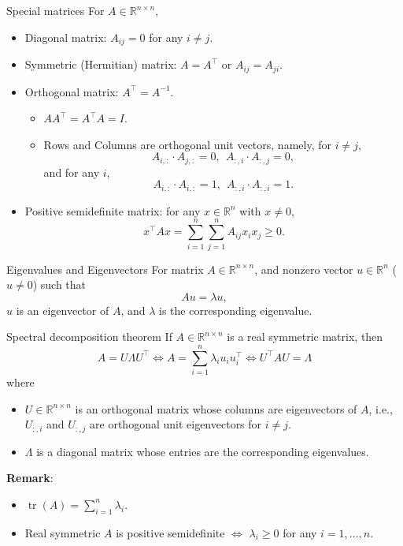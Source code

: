 \documentclass[10pt]{beamer}
\begin{document}
\begin{frame}{Special matrices}
For $A \in \mathbb{R}^{n \times n}$,
\begin{itemize}
    \item Diagonal matrix: $A_{ij} = 0$ for any $i \ne j$. 
    \item Symmetric (Hermitian) matrix: $A = A^\top$ or $A_{ij} = A_{ji}$.
    \item Orthogonal matrix: $A^\top = A^{-1}$. 
        \begin{itemize}
            \item $AA^\top = A^\top A = I$. 
            \item Rows and Columns are  orthogonal unit vectors, namely, for $i \ne j$,
            \[A_{i, :} \cdot A_{j, :} = 0, ~~ A_{:, i}\cdot A_{:, j} = 0,\]
            and for any $i$,
            \[A_{i, :} \cdot A_{i, :} = 1, ~~ A_{:, i}\cdot A_{:, i} = 1.\]
        \end{itemize}
    \item Positive semidefinite matrix: for any $x \in \mathbb{R}^n$ with $x \ne 0$, 
    \[
        x^\top A x = \sum_{i = 1}^n\sum_{j = 1}^n A_{ij}x_i x_j \ge 0.
    \]
\end{itemize}
\end{frame}


\begin{frame}{Eigenvalues and Eigenvectors}
For matrix $A \in \mathbb{R}^{n \times n}$, and nonzero vector $u \in \mathbb{R}^n$ ($u \ne 0$) such that 
\[
    Au = \lambda u,
\]
$u$ is an eigenvector of $A$, and $\lambda$ is the corresponding eigenvalue.  
\end{frame}

\begin{frame}{Spectral decomposition theorem}
    If $A \in \mathbb{R}^{n \times n}$ is a real symmetric matrix, then 
    \[
    A = U\Lambda U^\top \Leftrightarrow A = \sum_{i = 1}^n \lambda_i u_i u_i^\top \Leftrightarrow U^\top A U = \Lambda 
    \]
    where 
    \begin{itemize}
        \item $U \in \mathbb{R}^{n \times n}$ is an orthogonal matrix whose columns are eigenvectors of $A$, i.e., $U_{:, i}$ and $U_{:, j}$ are orthogonal unit eigenvectors for $i \ne j$. 
        \item $\Lambda$ is a diagonal matrix whose entries are the corresponding eigenvalues. 
    \end{itemize}
    \textbf{Remark}:
    \begin{itemize}
        \item $\operatorname{tr}(A) = \sum_{i = 1}^n \lambda_i$.
        \item Real symmetric $A$ is positive semidefinite $\Leftrightarrow$ $\lambda_i \ge 0$ for any $i = 1, \dots, n$.
    \end{itemize}
\end{frame}
\end{document}
